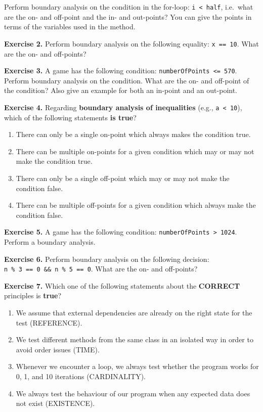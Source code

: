 Perform boundary analysis on the condition in the for-loop:
\texttt{i\ \textless{}\ half}, i.e.~what are the on- and off-point and
the in- and out-points? You can give the points in terms of the
variables used in the method.

\textbf{Exercise 2.} Perform boundary analysis on the following
equality: \texttt{x\ ==\ 10}. What are the on- and off-points?

\textbf{Exercise 3.} A game has the following condition:
\texttt{numberOfPoints\ \textless{}=\ 570}. Perform boundary analysis on
the condition. What are the on- and off-point of the condition? Also
give an example for both an in-point and an out-point.

\textbf{Exercise 4.} Regarding \textbf{boundary analysis of
inequalities} (e.g., \texttt{a\ \textless{}\ 10}), which of the
following statements \textbf{is true}?

\begin{enumerate}
\def\labelenumi{\arabic{enumi}.}
\tightlist
\item
  There can only be a single on-point which always makes the condition
  true.
\item
  There can be multiple on-points for a given condition which may or may
  not make the condition true.
\item
  There can only be a single off-point which may or may not make the
  condition false.
\item
  There can be multiple off-points for a given condition which always
  make the condition false.
\end{enumerate}

\textbf{Exercise 5.} A game has the following condition:
\texttt{numberOfPoints\ \textgreater{}\ 1024}. Perform a boundary
analysis.

\textbf{Exercise 6.} Perform boundary analysis on the following
decision: \texttt{n\ \%\ 3\ ==\ 0\ \&\&\ n\ \%\ 5\ ==\ 0}. What are the
on- and off-points?

\textbf{Exercise 7.} Which one of the following statements about the
\textbf{CORRECT} principles is \textbf{true}?

\begin{enumerate}
\def\labelenumi{\arabic{enumi}.}
\tightlist
\item
  We assume that external dependencies are already on the right state
  for the test (REFERENCE).
\item
  We test different methods from the same class in an isolated way in
  order to avoid order issues (TIME).
\item
  Whenever we encounter a loop, we always test whether the program works
  for 0, 1, and 10 iterations (CARDINALITY).
\item
  We always test the behaviour of our program when any expected data
  does not exist (EXISTENCE).
\end{enumerate}


